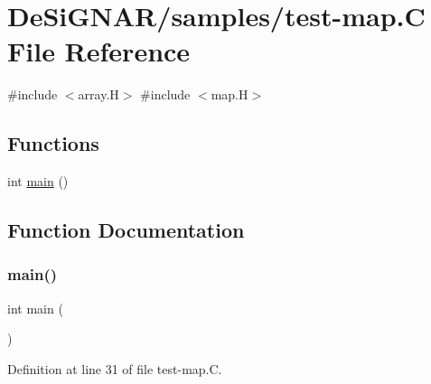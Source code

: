\hypertarget{test-map_8_c}{}\section{De\+Si\+G\+N\+A\+R/samples/test-\/map.C File Reference}
\label{test-map_8_c}
{\ttfamily \#include $<$array.\+H$>$}\newline
{\ttfamily \#include $<$map.\+H$>$}\newline
\subsection*{Functions}
\begin{DoxyCompactItemize}
\item 
int \hyperlink{test-map_8_c_ae66f6b31b5ad750f1fe042a706a4e3d4}{main} ()
\end{DoxyCompactItemize}


\subsection{Function Documentation}
\mbox{\label{test-map_8_c_ae66f6b31b5ad750f1fe042a706a4e3d4}} 
\subsubsection{\texorpdfstring{main()}{main()}}
{\footnotesize\ttfamily int main (\begin{DoxyParamCaption}{ }\end{DoxyParamCaption})}



Definition at line 31 of file test-\/map.\+C.


